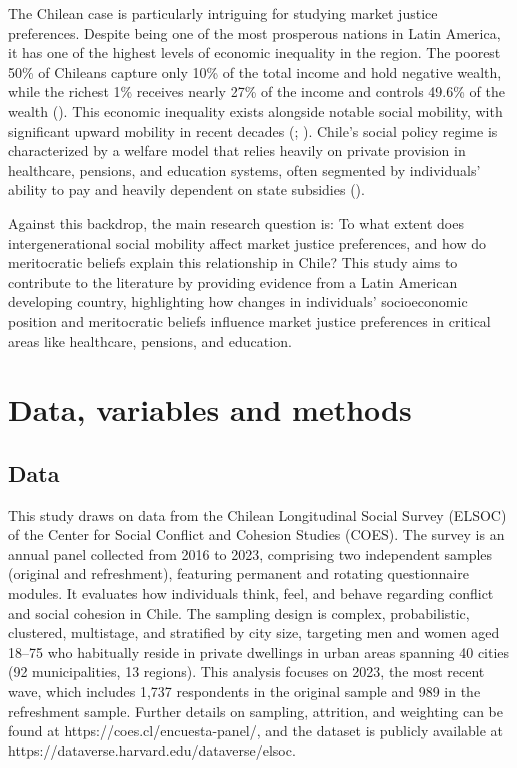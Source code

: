 \documentclass[
  12pt,
]{article}
\begin{document}
The Chilean case is particularly intriguing for studying market justice
preferences. Despite being one of the most prosperous nations in Latin
America, it has one of the highest levels of economic inequality in the
region. The poorest 50\% of Chileans capture only 10\% of the total
income and hold negative wealth, while the richest 1\% receives nearly
27\% of the income and controls 49.6\% of the wealth
(). This economic
inequality exists alongside notable social mobility, with significant
upward mobility in recent decades
(;
). Chile's
social policy regime is characterized by a welfare model that relies
heavily on private provision in healthcare, pensions, and education
systems, often segmented by individuals' ability to pay and heavily
dependent on state subsidies ().

Against this backdrop, the main research question is: To what extent
does intergenerational social mobility affect market justice
preferences, and how do meritocratic beliefs explain this relationship
in Chile? This study aims to contribute to the literature by providing
evidence from a Latin American developing country, highlighting how
changes in individuals' socioeconomic position and meritocratic beliefs
influence market justice preferences in critical areas like healthcare,
pensions, and education.

\section{Data, variables and methods}\label{data-variables-and-methods}

\subsection{Data}\label{data}

This study draws on data from the Chilean Longitudinal Social Survey
(ELSOC) of the Center for Social Conflict and Cohesion Studies (COES).
The survey is an annual panel collected from 2016 to 2023, comprising
two independent samples (original and refreshment), featuring permanent
and rotating questionnaire modules. It evaluates how individuals think,
feel, and behave regarding conflict and social cohesion in Chile. The
sampling design is complex, probabilistic, clustered, multistage, and
stratified by city size, targeting men and women aged 18--75 who
habitually reside in private dwellings in urban areas spanning 40 cities
(92 municipalities, 13 regions). This analysis focuses on 2023, the most
recent wave, which includes 1,737 respondents in the original sample and
989 in the refreshment sample. Further details on sampling, attrition,
and weighting can be found at https://coes.cl/encuesta-panel/, and the
dataset is publicly available at
https://dataverse.harvard.edu/dataverse/elsoc.
\end{document}
